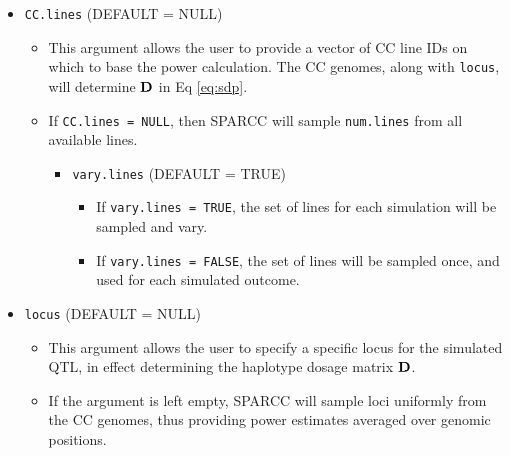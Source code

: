\begin{itemize}
    \item \texttt{CC.lines} (DEFAULT = NULL)
    \begin{itemize}
    	\item This argument allows the user to provide a vector of CC line IDs on which to base the power calculation. The CC genomes, along with \texttt{locus}, will determine $\mathbf{D}$ in Eq \ref{eq:sdp}. 
        \item If \texttt{CC.lines = NULL}, then SPARCC will sample \texttt{num.lines} from all available lines. 
        \begin{itemize}
        	\item \texttt{vary.lines} (DEFAULT = TRUE)
            \begin{itemize}
        		\item If \texttt{vary.lines = TRUE}, the set of lines for each simulation will be sampled and vary.
                \item If \texttt{vary.lines = FALSE}, the set of lines will be sampled once, and used for each simulated outcome.
            \end{itemize}
        \end{itemize}
    \end{itemize}
    
    \item \texttt{locus} (DEFAULT = NULL)
    \begin{itemize}
    	\item This argument allows the user to specify a specific locus for the simulated QTL, in effect determining the haplotype dosage matrix $\mathbf{D}$. 
        \item If the argument is left empty, SPARCC will sample loci uniformly from the CC genomes, thus providing power estimates averaged over genomic positions.
    \end{itemize}
    

\end{itemize}
